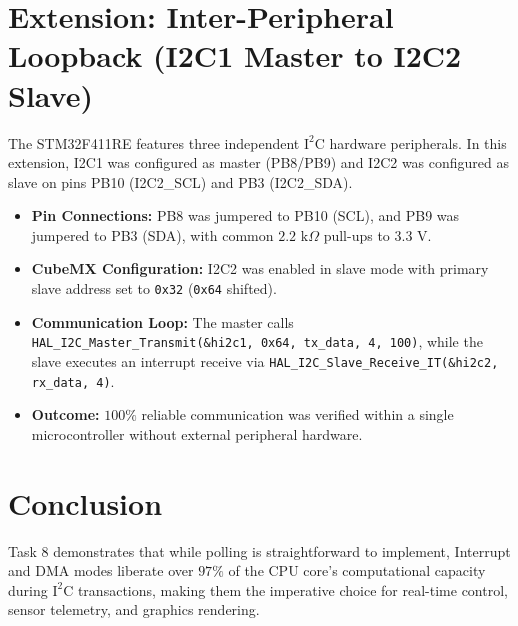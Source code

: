 \documentclass[11pt,a4paper]{article}
\begin{document}
\section{Extension: Inter-Peripheral Loopback (I2C1 Master to I2C2 Slave)}
The STM32F411RE features three independent $\text{I}^2\text{C}$ hardware peripherals. In this extension, I2C1 was configured as master (PB8/PB9) and I2C2 was configured as slave on pins PB10 (I2C2\_SCL) and PB3 (I2C2\_SDA).

\begin{itemize}
    \item \textbf{Pin Connections:} PB8 was jumpered to PB10 (SCL), and PB9 was jumpered to PB3 (SDA), with common $2.2\text{ k}\Omega$ pull-ups to $3.3\text{ V}$.
    \item \textbf{CubeMX Configuration:} I2C2 was enabled in slave mode with primary slave address set to \texttt{0x32} (\texttt{0x64} shifted).
    \item \textbf{Communication Loop:} The master calls \texttt{HAL\_I2C\_Master\_Transmit(\&hi2c1, 0x64, tx\_data, 4, 100)}, while the slave executes an interrupt receive via \texttt{HAL\_I2C\_Slave\_Receive\_IT(\&hi2c2, rx\_data, 4)}.
    \item \textbf{Outcome:} $100\%$ reliable communication was verified within a single microcontroller without external peripheral hardware.
\end{itemize}

\section{Conclusion}
Task 8 demonstrates that while polling is straightforward to implement, Interrupt and DMA modes liberate over $97\%$ of the CPU core's computational capacity during $\text{I}^2\text{C}$ transactions, making them the imperative choice for real-time control, sensor telemetry, and graphics rendering.
\end{document}
